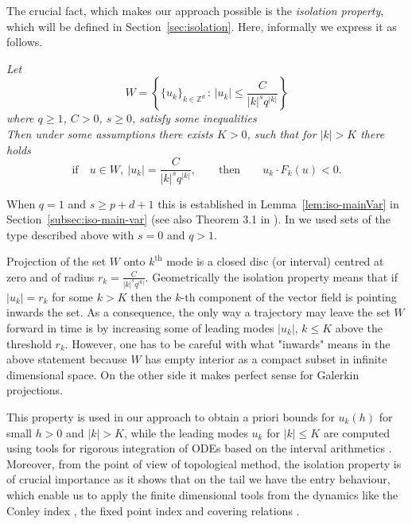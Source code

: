 The crucial fact, which makes our approach  possible is the \emph{isolation property}, which will be defined in Section~\ref{sec:isolation}.
Here, informally we express it as follows.

\emph{Let}
\begin{equation*}
   W=\left\{ \{u_k\}_{k \in \mathbb{Z}^d}\,:\,  |u_k| \leq \frac{C}{|k|^s q^{|k|}}\right\}
\end{equation*}
\emph{where $q\geq 1$, $C>0$, $s\geq 0$, satisfy some inequalities \\
Then under some assumptions there  exists $K>0$, such that for $|k| > K$ there holds}
\begin{equation*}
 \mbox{if} \quad u \in W, \ |u_k|=\frac{C}{|k|^s q^{|k|}}, \qquad \mbox{then} \qquad  u_k \cdot F_k(u) <0.
\end{equation*}

When $q=1$ and $s\geq p+d+1$ this is established in   Lemma~\ref{lem:iso-mainVar} in Section~\ref{subsec:iso-main-var} (see also Theorem 3.1 in \cite{ZKS3}). In  \cite{WZ} we used sets of the type described above with $s=0$ and $q>1$. %

Projection of the set $W$ onto $k^{\mathrm{th}}$ mode is a closed disc (or interval) centred at zero and of radius
$r_k =\frac{C}{|k|^s q^{|k|}}$. Geometrically the isolation property means that if $|u_k|=r_k$ for some $k> K$ then the $k$-th component of the vector field is pointing inwards the set. As a consequence, the only way a trajectory may leave the set $W$ forward in time is by increasing some of leading modes $|u_k|$, $k\leq K$ above the threshold $r_k$. However, one has to be careful with what "inwards" means in the above statement because $W$ has empty interior as a compact subset in infinite dimensional space. On the other side it makes perfect sense for Galerkin projections.


This property is used   in  our approach to obtain a priori bounds for $u_k(h)$ for small $h>0$ and $|k|>K$, while the leading modes $u_k$ for $|k| \leq K$ are computed using  tools for rigorous integration of ODEs \cite{CAPDREVIEW,Lo,NJP} based on the interval arithmetics \cite{Mo}. Moreover, from the point of view of topological method, the isolation property is of crucial importance as it shows that on the tail we have the entry behaviour, which enable us to apply the finite dimensional tools from the dynamics like
the Conley index \cite{ZM}, the  fixed point index and  covering relations \cite{ZKS3}.

